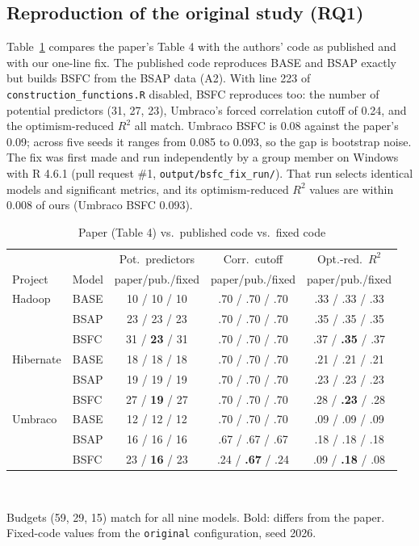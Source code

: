 \documentclass[conference]{IEEEtran}
\begin{document}
\subsection{Reproduction of the original study (RQ1)}\label{sec:repro}
Table~\ref{tab:repro} compares the paper's Table 4 with the authors' code as published and with our one-line fix. The published code reproduces BASE and BSAP exactly but builds BSFC from the BSAP data (A2). With line 223 of \texttt{construction\_functions.R} disabled, BSFC reproduces too: the number of potential predictors (31, 27, 23), Umbraco's forced correlation cutoff of 0.24, and the optimism-reduced $R^2$ all match. Umbraco BSFC is 0.08 against the paper's 0.09; across five seeds it ranges from 0.085 to 0.093, so the gap is bootstrap noise. The fix was first made and run independently by a group member on Windows with R 4.6.1 (pull request \#1, \texttt{output/bsfc\_fix\_run/}). That run selects identical models and significant metrics, and its optimism-reduced $R^2$ values are within 0.008 of ours (Umbraco BSFC 0.093).

\begin{table}[!h]
\centering
\caption{Paper (Table 4) vs.\ published code vs.\ fixed code}
\label{tab:repro}
\footnotesize
\setlength{\tabcolsep}{2.6pt}
\begin{tabular}{@{}llccc@{}}
\toprule
 & & Pot.\ predictors & Corr.\ cutoff & Opt.-red.\ $R^2$ \\
Project & Model & paper/pub./fixed & paper/pub./fixed & paper/pub./fixed \\
\midrule
Hadoop & BASE & 10 / 10 / 10 & .70 / .70 / .70 & .33 / .33 / .33 \\
 & BSAP & 23 / 23 / 23 & .70 / .70 / .70 & .35 / .35 / .35 \\
 & BSFC & 31 / \textbf{23} / 31 & .70 / .70 / .70 & .37 / \textbf{.35} / .37 \\
\midrule
Hibernate & BASE & 18 / 18 / 18 & .70 / .70 / .70 & .21 / .21 / .21 \\
 & BSAP & 19 / 19 / 19 & .70 / .70 / .70 & .23 / .23 / .23 \\
 & BSFC & 27 / \textbf{19} / 27 & .70 / .70 / .70 & .28 / \textbf{.23} / .28 \\
\midrule
Umbraco & BASE & 12 / 12 / 12 & .70 / .70 / .70 & .09 / .09 / .09 \\
 & BSAP & 16 / 16 / 16 & .67 / .67 / .67 & .18 / .18 / .18 \\
 & BSFC & 23 / \textbf{16} / 23 & .24 / \textbf{.67} / .24 & .09 / \textbf{.18} / .08 \\
\bottomrule
\end{tabular}\\[2pt]
\raggedright\scriptsize Budgets (59, 29, 15) match for all nine models. Bold: differs from the paper. Fixed-code values from the \texttt{original} configuration, seed 2026.
\end{table}
\end{document}
